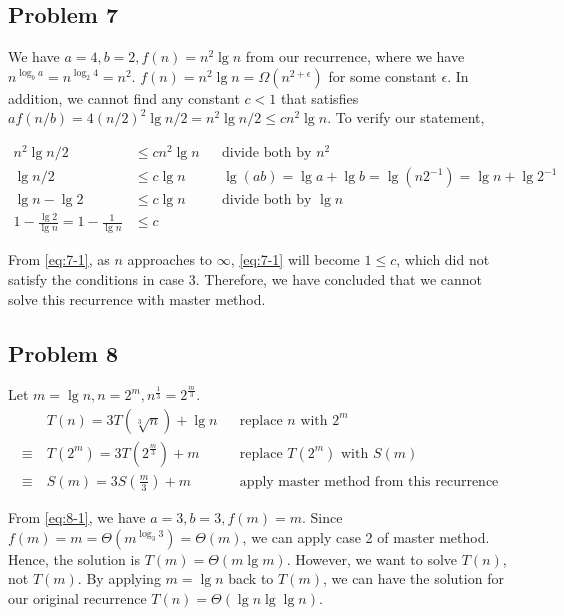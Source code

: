 \documentclass[a4paper]{article}
\makeatletter
\newenvironment{solution}
  {\begin{proof}[Solution]}
  {\end{proof}}
\renewenvironment{proof}[1][\proofname]{%
  \par\pushQED{\qed}\normalfont%
  \topsep6\p@\@plus6\p@\relax
  \trivlist\item[\hskip\labelsep\bfseries#1\@addpunct{.}]%
  \ignorespaces
}{%
  \popQED\endtrivlist\@endpefalse
}
\makeatother
\begin{document}
\subsection*{Problem 7}

\begin{solution}
  We have $a = 4, b = 2, f(n) = n^2\lg n$ from our recurrence, where we have $n^{\log_{b}a} = n^{\log_{2}4} = n^2$. $f(n) = n^2\lg n= \Omega({n^{2 + \epsilon}})$ for some constant $\epsilon$. In addition, we cannot find any constant $c < 1$ that satisfies $af(n/b) = 4(n/2)^2\lg n/2  = n^2\lg n/2 \le cn^2 \lg n$. To verify our statement,

  \begin{align}
    n^2\lg n/2 &\le cn^2 \lg n && \text{divide both by $n^2$}\nonumber\\
    \lg n/2 &\le c\lg n && \lg(ab) = \lg a + \lg b = \lg(n2^{-1}) = \lg n + \lg2^{-1}\nonumber\\
    \lg n - \lg 2 &\le c\lg n && \text{divide both by $\lg n$}\nonumber\\
    1 - \frac{\lg 2}{\lg n} = 1 - \frac{1}{\lg n}&\le c \label{eq:7-1}
  \end{align}

  From \eqref{eq:7-1}, as $n$ approaches to $\infty$, \eqref{eq:7-1} will become $1 \le c$, which did not satisfy the conditions in case 3. Therefore, we have concluded that we cannot solve this recurrence with master method.
\end{solution}
\setcounter{equation}{0}

\subsection*{Problem 8}
\begin{solution}
  Let $m = \lg n, n = 2^m, n^{\frac{1}{3}} = 2^{\frac{m}{3}}$.
  \begin{align}
          & T(n) = 3T(\sqrt[3]{n}) + \lg n && \text{replace $n$ with $2^m$}\nonumber\\
    \equiv\ & T(2^m) = 3T(2^{\frac{m}{3}}) + m && \text{replace $T(2^m)$ with $S(m)$}\nonumber\\
    \equiv\ & S(m) = 3S(\frac{m}{3}) + m \label{eq:8-1} && \text{apply master method from this recurrence}
  \end{align}

  From \eqref{eq:8-1}, we have $a = 3, b = 3, f(m) = m$. Since $f(m) =m = \Theta(m^{\log_{3}{3}}) = \Theta(m)$, we can apply case 2 of master method. Hence, the solution is $T(m) = \Theta(m\lg m)$. However, we want to solve $T(n)$, not $T(m)$. By applying $m = \lg n$ back to $T(m)$, we can have the solution for our original recurrence $T(n) = \Theta(\lg n \lg \lg n)$.
\end{solution}
\end{document}
